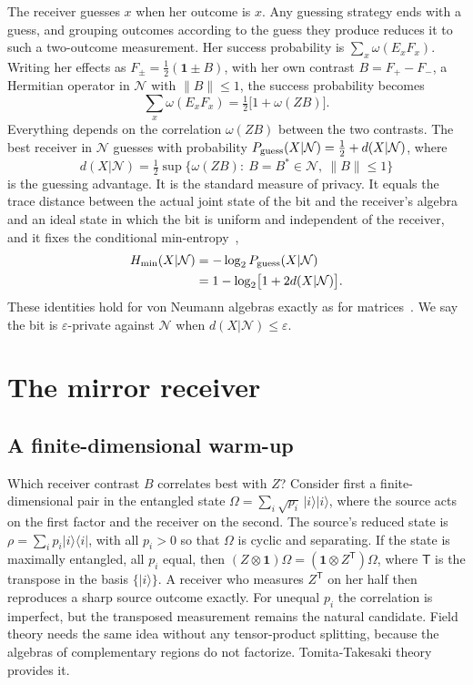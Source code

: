 \documentclass[11pt,a4paper]{article}
\providecommand{\openone}{\mathbf{1}}
\newcommand{\N}{\mathcal N}
\newcommand{\id}{\openone}
\newcommand{\pg}{P_{\rm guess}}
\begin{document}
The receiver guesses $x$ when her outcome is $x$. Any guessing strategy ends with a guess, and grouping outcomes according to the guess they produce reduces it to such a two-outcome measurement. Her success probability is $\sum_x\omega(E_xF_x)$. Writing her effects as $F_\pm=\tfrac12(\id\pm B)$, with her own contrast $B=F_+-F_-$, a Hermitian operator in $\N$ with $\|B\|\le1$, the success probability becomes
\begin{equation}
 \sum_x\omega(E_xF_x)=\tfrac12\bigl[1+\omega(ZB)\bigr].
 \label{eq:success}
\end{equation}
Everything depends on the correlation $\omega(ZB)$ between the two contrasts. The best receiver in $\N$ guesses with probability $\pg(X|\N)=\tfrac12+d(X|\N)$, where
\begin{equation}
 d(X|\N)=\tfrac12\sup\bigl\{\omega(ZB):\ B=B^*\in\N,\ \|B\|\le1\bigr\}
 \label{eq:privacy}
\end{equation}
is the guessing advantage. It is the standard measure of privacy. It equals the trace distance between the actual joint state of the bit and the receiver's algebra and an ideal state in which the bit is uniform and independent of the receiver, and it fixes the conditional min-entropy~\cite{koenig2009operational,berta2016smooth},
\begin{equation*}
 \begin{aligned}
 H_{\min}(X|\N)&=-\log_2\pg(X|\N)\\
 &=1-\log_2\bigl[1+2d(X|\N)\bigr].
 \end{aligned}
\end{equation*}
These identities hold for von Neumann algebras exactly as for matrices~\cite{helstrom1969quantum,koenig2009operational}. We say the bit is $\varepsilon$-private against $\N$ when $d(X|\N)\le\varepsilon$.

\section{The mirror receiver}
\label{sec:overlap}

\subsection{A finite-dimensional warm-up}

Which receiver contrast $B$ correlates best with $Z$? Consider first a finite-dimensional pair in the entangled state $\Omega=\sum_i\sqrt{p_i}\,|i\rangle|i\rangle$, where the source acts on the first factor and the receiver on the second. The source's reduced state is $\rho=\sum_ip_i|i\rangle\langle i|$, with all $p_i>0$ so that $\Omega$ is cyclic and separating. If the state is maximally entangled, all $p_i$ equal, then $(Z\otimes\id)\Omega=(\id\otimes Z^{\mathsf T})\Omega$, where $\mathsf T$ is the transpose in the basis $\{|i\rangle\}$. A receiver who measures $Z^{\mathsf T}$ on her half then reproduces a sharp source outcome exactly. For unequal $p_i$ the correlation is imperfect, but the transposed measurement remains the natural candidate. Field theory needs the same idea without any tensor-product splitting, because the algebras of complementary regions do not factorize. Tomita-Takesaki theory provides it.
\end{document}
